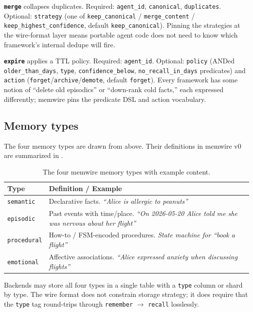 \documentclass[11pt,letterpaper,twocolumn]{article}
\begin{document}
\textbf{\texttt{merge}} collapses duplicates. Required: \texttt{agent\_id}, \texttt{canonical}, \texttt{duplicates}. Optional: \texttt{strategy} (one of \texttt{keep\_canonical} / \texttt{merge\_content} / \texttt{keep\_highest\_confidence}, default \texttt{keep\_canonical}). Pinning the strategies at the wire-format layer means portable agent code does not need to know which framework's internal dedupe will fire.

\textbf{\texttt{expire}} applies a TTL policy. Required: \texttt{agent\_id}. Optional: \texttt{policy} (ANDed \texttt{older\_than\_days}, \texttt{type}, \texttt{confidence\_below}, \texttt{no\_recall\_in\_days} predicates) and \texttt{action} (\texttt{forget}/\texttt{archive}/\texttt{demote}, default \texttt{forget}). Every framework has some notion of ``delete old episodics'' or ``down-rank cold facts,'' each expressed differently; memwire pins the predicate DSL and action vocabulary.

\subsection{Memory types}
\label{sec:spec-types}

The four memory types are drawn from  above. Their definitions in memwire v0 are summarized in .

\begin{table}[t]
\centering
\caption{The four memwire memory types with example content.}
\label{tab:types}
\small
\begin{tabularx}{\columnwidth}{lX}
\toprule
\textbf{Type} & \textbf{Definition / Example} \\
\midrule
\texttt{semantic}   & Declarative facts. \emph{``Alice is allergic to peanuts''} \\
\texttt{episodic}   & Past events with time/place. \emph{``On 2026-05-20 Alice told me she was nervous about her flight''} \\
\texttt{procedural} & How-to / FSM-encoded procedures. \emph{State machine for ``book a flight''} \\
\texttt{emotional}  & Affective associations. \emph{``Alice expressed anxiety when discussing flights''} \\
\bottomrule
\end{tabularx}
\end{table}

Backends may store all four types in a single table with a \texttt{type} column or shard by type. The wire format does not constrain storage strategy; it does require that the \texttt{type} tag round-trips through \texttt{remember} $\rightarrow$ \texttt{recall} losslessly.
\end{document}
